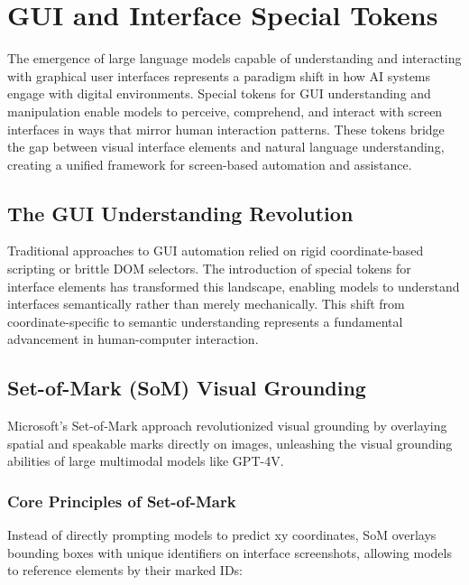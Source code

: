 \section{GUI and Interface Special Tokens}

The emergence of large language models capable of understanding and interacting with graphical user interfaces represents a paradigm shift in how AI systems engage with digital environments. Special tokens for GUI understanding and manipulation enable models to perceive, comprehend, and interact with screen interfaces in ways that mirror human interaction patterns. These tokens bridge the gap between visual interface elements and natural language understanding, creating a unified framework for screen-based automation and assistance.

\subsection{The GUI Understanding Revolution}

Traditional approaches to GUI automation relied on rigid coordinate-based scripting or brittle DOM selectors. The introduction of special tokens for interface elements has transformed this landscape, enabling models to understand interfaces semantically rather than merely mechanically. This shift from coordinate-specific to semantic understanding represents a fundamental advancement in human-computer interaction.

\subsection{Set-of-Mark (SoM) Visual Grounding}

Microsoft's Set-of-Mark approach revolutionized visual grounding by overlaying spatial and speakable marks directly on images, unleashing the visual grounding abilities of large multimodal models like GPT-4V.

\subsubsection{Core Principles of Set-of-Mark}

Instead of directly prompting models to predict xy coordinates, SoM overlays bounding boxes with unique identifiers on interface screenshots, allowing models to reference elements by their marked IDs:


